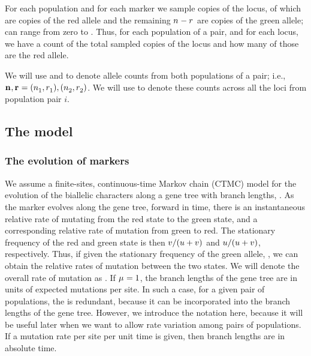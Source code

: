 For each population and for each marker we sample \allelecount
copies of the locus, \redallelecount of which are copies of the red
allele and the remaining $\allelecount - \redallelecount$ are
copies of the green allele;
\redallelecount can range from zero to \allelecount.
Thus, for each population of a pair, and for each locus, we have a count of the
total sampled copies of the locus and how many of those are the red allele.

We will use \leafallelecounts and \leafredallelecounts to denote allele counts
from both populations of a pair; i.e., 
$\leafallelecounts, \leafredallelecounts = (\allelecount[1], \redallelecount[1]), 
(\allelecount[2], \redallelecount[2])$.
We will use \comparisondata[i] to denote these counts across all the loci from
population pair $i$.


\subsection{The model}

\subsubsection{The evolution of markers}

We assume a finite-sites, continuous-time Markov chain (CTMC) model for the
evolution of the biallelic characters along a gene tree with branch lengths,
\genetree.
As the marker evolves along the gene tree, forward in time, there is an
instantaneous relative rate \rgmurate of mutating from the red state to the
green state, and a corresponding relative rate \grmurate of mutation from green
to red.
The stationary frequency of the red and green state is then
$\grmurate / (\rgmurate + \grmurate)$
and
$\rgmurate / (\rgmurate + \grmurate)$, respectively.
Thus, if given the stationary frequency of the green allele, \gfreq, we can
obtain the relative rates of mutation between the two states.
We will denote the overall rate of mutation as \murate.
If $\murate = 1$, the branch lengths of the gene tree are in units of expected
mutations per site.
In such a case, for a given pair of populations, the \murate is 
redundant, because it can be incorporated into the branch lengths of the gene
tree.
However, we introduce the notation here, because it will be useful later when
we want to allow rate variation among pairs of populations.
If a mutation rate per site per unit time is given, then branch lengths are in
absolute time.


